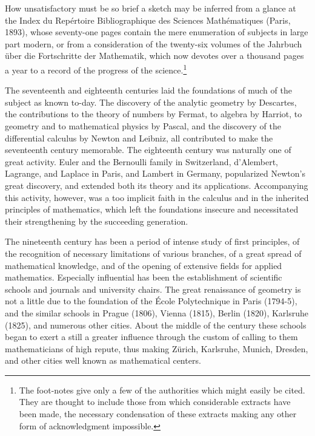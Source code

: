 \documentclass[oneside]{book}
\begin{document}
How unsatisfactory must be so brief a sketch may be inferred from a
glance at the Index du Rep\'ertoire Bibliographique des Sciences
Math\'ematiques (Paris, 1893), whose seventy-one pages contain the
mere enumeration of subjects in large part modern, or from a
consideration of the twenty-six volumes of the Jahrbuch \"uber die
Fortschritte der Mathematik, which now devotes over a thousand pages
a year to a record of the progress of the science.\footnote{The
foot-notes give only a few of the authorities which might easily be
cited. They are thought to include those from which considerable
extracts have been made, the necessary condensation of these
extracts making any other form of acknowledgment impossible.}

The seventeenth and eighteenth centuries laid the foundations of
much of the subject as known to-day. The discovery of the analytic
geometry by Descartes, the contributions to the theory of numbers by
Fermat, to algebra by Harriot, to geometry and to mathematical
physics by Pascal, and the discovery of the differential calculus by
Newton and Leibniz, all contributed to make the seventeenth century
memorable. The eighteenth century was naturally one of great
activity. Euler and the Bernoulli family in Switzerland,
d'Alembert, Lagrange, and Laplace in Paris, and Lambert in Germany,
popularized Newton's great discovery, and extended both its theory
and its applications. Accompanying this activity, however, was a too
implicit faith in the calculus and in the inherited principles of
mathematics, which left the foundations insecure and necessitated
their strengthening by the succeeding generation.

The nineteenth century has been a period of intense study of first
principles, of the recognition of necessary limitations of various
branches, of a great spread of mathematical knowledge, and of the
opening of extensive fields for applied mathematics. Especially
influential has been the establishment of scientific schools and
journals and university chairs. The great renaissance of geometry is
not a little due to the foundation of the \'Ecole Polytechnique in
Paris (1794-5), and the similar schools in Prague (1806), Vienna
(1815), Berlin (1820), Karlsruhe (1825), and numerous other
cities. About the middle of the century these schools began to exert
a still a greater influence through the custom of calling to them
mathematicians of high repute, thus making Z\"urich, Karlsruhe,
Munich, Dresden, and other cities well known as mathematical centers.
\end{document}

